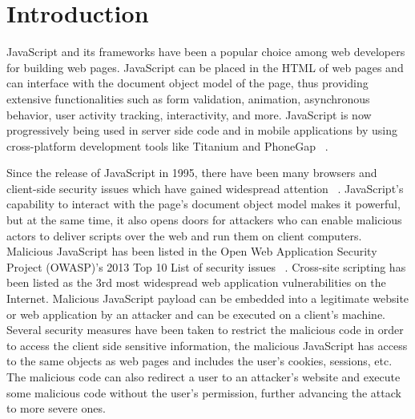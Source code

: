 \chapter{Introduction}
\iffalse

\LaTeX\ can be viewed
as a compiled programming language, in contrast to that 
nightmare known as Microsoft Word,
which can be viewed as an interpreted language. So, to typeset a
document in \LaTeX, you create a text file that has the {\tt .tex} extension.
This file includes some special
commands, known as macros. Then
you compile your {\tt .tex} file by running  \LaTeX,
which produces your typeset document, as a pdf. 

In this paper, a few basics are discussed. There are plenty of good online resource
if you need help with more advanced topics.
\fi

JavaScript and its frameworks have been a popular choice among web developers for building web pages. JavaScript can be placed in the HTML of web pages and can interface with the document object model of the page, thus providing extensive functionalities such as form validation, animation, asynchronous behavior, user activity tracking, interactivity, and more. JavaScript is now progressively being used in server side code and in mobile applications by using cross-platform development tools like Titanium and PhoneGap ~\cite{g10}. 

Since the release of JavaScript in 1995, there have been many browsers and client-side security issues which have gained widespread attention ~\cite{g9}. JavaScript's capability to interact with the page's document object model makes it powerful, but at the same time, it also opens doors for attackers who can enable malicious actors to deliver scripts over the web and run them on client computers. Malicious JavaScript has been listed in the Open Web Application Security Project (OWASP)'s 2013 Top 10 List of security issues ~\cite{g2}. Cross-site scripting has been listed as the 3rd most widespread web application vulnerabilities on the Internet. Malicious JavaScript payload can be embedded into a legitimate website or web application by an attacker and can be executed on a client's machine. Several security measures have been taken to restrict the malicious code in order to access the client side sensitive information, the malicious JavaScript has access to the same objects as web pages and includes the user's cookies, sessions, etc. The malicious code can also redirect a user to an attacker's website and execute some malicious code without the user's permission, further advancing the attack to more severe ones.

